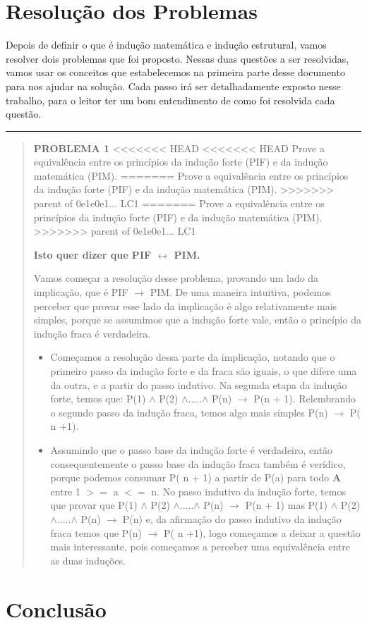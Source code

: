 \documentclass[a4paper, 10pt]{article}
\begin{document}
\section{Resolução dos Problemas}
Depois de definir o que é indução matemática e indução estrutural, vamos resolver dois problemas que foi proposto. Nessas duas questões a ser resolvidas, vamos usar os conceitos que estabelecemos na primeira parte desse documento para nos ajudar na solução. Cada passo irá ser detalhadamente exposto nesse trabalho, para o leitor ter um bom entendimento de como foi resolvida cada questão.
\hrule
\begin{quote}
        \textbf{PROBLEMA 1}
<<<<<<< HEAD
<<<<<<< HEAD
        Prove a equivalência entre os princípios da indução forte (PIF) e da indução matemática (PIM).
=======
       Prove a equivalência entre os princípios da indução forte (PIF) e da indução matemática (PIM).
>>>>>>> parent of 0e1e0e1... LC1
=======
       Prove a equivalência entre os princípios da indução forte (PIF) e da indução matemática (PIM).
>>>>>>> parent of 0e1e0e1... LC1
        
        \textbf{Isto quer dizer que PIF $\leftrightarrow$ PIM.}
       
       
        Vamos começar a resolução desse problema, provando um lado da implicação, que é PIF $\to$ PIM. De uma maneira intuitiva, podemos perceber que provar esse lado da implicação é algo relativamente mais simples, porque se assumimos que a indução forte vale, então o princípio da indução fraca é verdadeira.
        \begin{itemize}
            \item Começamos a resolução dessa parte da implicação, notando que o primeiro passo da indução forte e da fraca são iguais, o que difere uma da outra, e a partir do passo indutivo. Na segunda etapa da indução forte, temos que: P(1) $\wedge$ P(2) $\wedge$.....$\wedge$ P(n) $\to$ P(n + 1). Relembrando o segundo passo da indução fraca, temos algo mais simples P(n) $\to$ P( n +1).
            
            \item Assumindo que o passo base da indução forte é verdadeiro, então consequentemente o passo base da indução fraca também é verídico, porque podemos consumar P( n + 1) a partir de P(a) para todo \textbf{A} entre 1 $>=$ a $<=$ n. No passo indutivo da indução forte, temos que provar que P(1) $\wedge$ P(2) $\wedge$.....$\wedge$ P(n) $\to$ P(n + 1) mas P(1) $\wedge$ P(2) $\wedge$.....$\wedge$ P(n) $\to$ P(n) e, da afirmação do passo indutivo da indução fraca temos que  P(n) $\to$ P( n +1), logo começamos a deixar a questão mais interessante, pois começamos a perceber uma equivalência entre as duas induções.
        \end{itemize}
    \end{quote}



\section{Conclusão}
\end{document}
